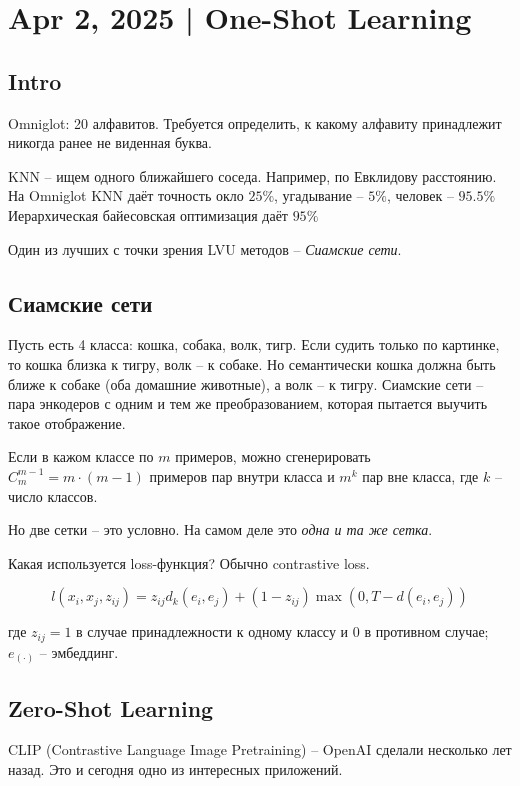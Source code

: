 \documentclass[a4paper,12pt]{article}
\begin{document}
\section{Apr 2, 2025 | One-Shot Learning}
\subsection{Intro}

Omniglot: 20 алфавитов.
Требуется определить, к какому алфавиту принадлежит никогда ранее не виденная буква.

KNN -- ищем одного ближайшего соседа.
Например, по Евклидову расстоянию.
На Omniglot KNN даёт точность окло $ 25\% $, угадывание -- $ 5\% $, человек -- $ 95.5\% $
Иерархическая байесовская оптимизация даёт $ 95\% $

Один из лучших с точки зрения LVU методов -- \emph{Сиамские сети}.

\subsection{Сиамские сети}

Пусть есть 4 класса: кошка, собака, волк, тигр.
Если судить только по картинке, то кошка близка к тигру, волк -- к собаке.
Но семантически кошка должна быть ближе к собаке (оба домашние животные), а волк -- к тигру.
Сиамские сети -- пара энкодеров с одним и тем же преобразованием, которая пытается выучить такое отображение.

Если в кажом классе по $ m $ примеров, можно сгенерировать $ C_m^{m-1} = m \cdot (m-1) $ примеров пар внутри класса и $ m^k $ пар вне класса, где $ k $ -- число классов.

Но две сетки -- это условно.
На самом деле это \emph{одна и та же сетка}.

Какая используется loss-функция?
Обычно contrastive loss.

\[ l(x_i, x_j, z_{ij}) = z_{ij} d_k(e_i, e_j) + (1 - z_{ij}) \max(0, T - d(e_i, e_j)) \]

где $ z_{ij} = 1 $ в случае принадлежности к одному классу и $ 0 $ в противном случае; $e_{(\cdot)} $ -- эмбеддинг.

\subsection{Zero-Shot Learning}

CLIP (Contrastive Language Image Pretraining) -- OpenAI сделали несколько лет назад.
Это и сегодня одно из интересных приложений.
\end{document}
